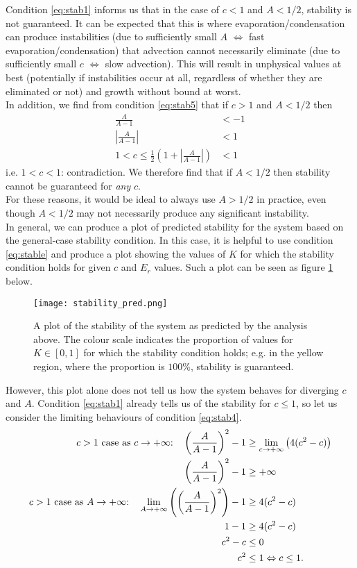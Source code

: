 \documentclass[11pt]{article}
\begin{document}
Condition \ref{eq:stab1} informs us that in the case of $c<1$ and $A<1/2$, stability is not guaranteed. It can be expected that this is where evaporation/condensation can produce instabilities (due to sufficiently small $A$ $\Leftrightarrow$ fast evaporation/condensation) that advection cannot necessarily eliminate (due to sufficiently small $c$ $\Leftrightarrow$ slow advection). This will result in unphysical values at best (potentially if instabilities occur at all, regardless of whether they are eliminated or not) and growth without bound at worst. \\
In addition, we find from condition \ref{eq:stab5} that if $c>1$ and $A<1/2$ then
\begin{align*}
\frac{A}{A-1} &< -1 \\
\left|\frac{A}{A-1}\right| &< 1 \\
1 < c \leq \frac{1}{2}\left(1 + \left|\frac{A}{A-1}\right|\right) &< 1
\end{align*}
i.e. $1<c<1$: contradiction. We therefore find that if $A<1/2$ then stability cannot be guaranteed for \emph{any} $c$. \\
For these reasons, it would be ideal to always use $A>1/2$ in practice, even though $A<1/2$ may not necessarily produce any significant instability. \\
In general, we can produce a plot of predicted stability for the system based on the general-case stability condition. In this case, it is helpful to use condition \ref{eq:stable} and produce a plot showing the values of $K$ for which the stability condition holds for given $c$ and $E_r$ values. Such a plot can be seen as figure \ref{fig:stability_pred} below.
\begin{figure}[H]
\centering
\texttt{[image: stability\_pred.png]}
\caption{A plot of the stability of the system as predicted by the analysis above. The colour scale indicates the proportion of values for $K\in[0,1]$ for which the stability condition holds; e.g. in the yellow region, where the proportion is $100\%$, stability is guaranteed.}
\label{fig:stability_pred}
\end{figure}
However, this plot alone does not tell us how the system behaves for diverging $c$ and $A$. Condition \ref{eq:stab1} already tells us of the stability for $c\leq 1$, so let us consider the limiting behaviours of condition \ref{eq:stab4}.
\begin{align}
\text{$c>1$ case as $c\to +\infty$:\quad} \left(\frac{A}{A-1}\right)^2 -1 &\geq \lim_{c\to +\infty}\left(4(c^2-c)\right) \nonumber \\
\left(\frac{A}{A-1}\right)^2 -1 &\geq +\infty		\label{eq:stab2} \\
\text{$c>1$ case as $A\to +\infty$:\quad} \lim_{A\to +\infty}\left(\left(\frac{A}{A-1}\right)^2\right)-1 &\geq 4(c^2-c) \nonumber\\
1 - 1 &\geq 4(c^2-c) \nonumber\\
c^2-c &\leq 0 \nonumber\\
c^2 &\leq 1 \Leftrightarrow
c \leq 1.		\label{eq:stab3}
\end{align}
\end{document}
